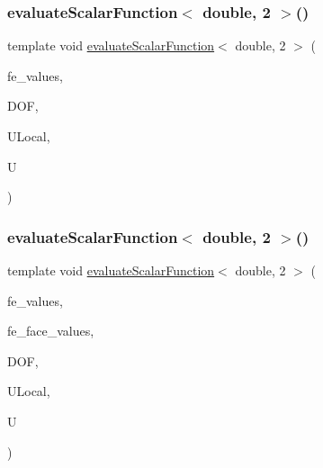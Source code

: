 \mbox{\label{function_evaluations_8cc_a675557db3f31c27e2c45a8bee20dd42a}} 
\subsubsection{\texorpdfstring{evaluateScalarFunction$<$ double, 2 $>$()}{evaluateScalarFunction< double, 2 >()}\hspace{0.1cm}{\footnotesize\ttfamily [1/2]}}
{\footnotesize\ttfamily template void \mbox{\hyperlink{group___evaluation_functions_ga2e2fbeb2173113c6889c73bbb7304789}{evaluate\+Scalar\+Function}}$<$ double, 2 $>$ (\begin{DoxyParamCaption}\item[{const F\+E\+Values$<$ 2 $>$ \&}]{fe\+\_\+values,  }\item[{unsigned int}]{D\+OF,  }\item[{Table$<$ 1, double $>$ \&}]{U\+Local,  }\item[{Table$<$ 1, double $>$ \&}]{U }\end{DoxyParamCaption})}

\mbox{\label{function_evaluations_8cc_a9d228a6175fb599a42cf7a0721ad2f32}} 
\subsubsection{\texorpdfstring{evaluateScalarFunction$<$ double, 2 $>$()}{evaluateScalarFunction< double, 2 >()}\hspace{0.1cm}{\footnotesize\ttfamily [2/2]}}
{\footnotesize\ttfamily template void \mbox{\hyperlink{group___evaluation_functions_ga2e2fbeb2173113c6889c73bbb7304789}{evaluate\+Scalar\+Function}}$<$ double, 2 $>$ (\begin{DoxyParamCaption}\item[{const F\+E\+Values$<$ 2 $>$ \&}]{fe\+\_\+values,  }\item[{const F\+E\+Face\+Values$<$ 2 $>$ \&}]{fe\+\_\+face\+\_\+values,  }\item[{unsigned int}]{D\+OF,  }\item[{Table$<$ 1, double $>$ \&}]{U\+Local,  }\item[{Table$<$ 1, double $>$ \&}]{U }\end{DoxyParamCaption})}

